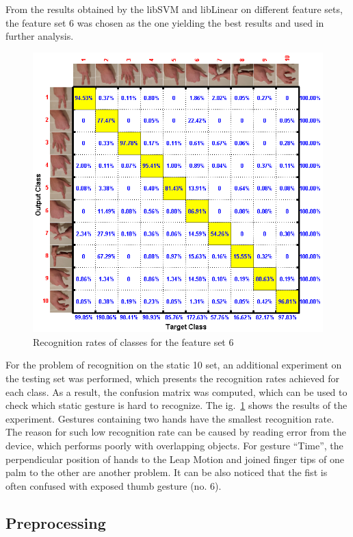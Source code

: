 From the results obtained by the libSVM and libLinear on different feature sets, the feature set $6$ was chosen as the one yielding the best results and used in further analysis.

\begin{figure}[htb]
\centering
 \includegraphics[width=0.8\columnwidth]{figures/staticClassesRecognitionRates.png}
 \caption{Recognition rates of classes for the feature set $6$}
 \label{staticClassesRecognitionRates}
\end{figure}

For the problem of recognition on the static 10 set, an additional experiment on the testing set was performed, which presents the recognition rates achieved for each class. 
As a result, the confusion matrix was computed, which can be used to check which static gesture is hard to recognize. The ig.~\ref{staticClassesRecognitionRates} shows the results of the experiment. 
Gestures containing two hands have the smallest recognition rate. 
The reason for such low recognition rate can be caused by reading error from the device, which performs poorly with overlapping objects. 
For gesture ``Time'', the perpendicular position of hands to the Leap Motion and joined finger tips of one palm to the other are another problem. It can be also noticed that the fist is often confused with exposed thumb gesture (no. $6$).

\subsection{Preprocessing}

